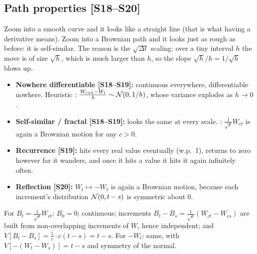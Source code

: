 \documentclass[10pt]{article}
\begin{document}
\subsection{Path properties [S18--S20]}
\begin{idea}
Zoom into a smooth curve and it looks like a straight line (that is what having a derivative means). Zoom into a Brownian path and it looks just as rough as before: it is self-similar. The reason is the $\sqrt{\Delta t}$ scaling: over a tiny interval $h$ the move is of size $\sqrt h$, which is much larger than $h$, so the slope $\sqrt h/h=1/\sqrt h$ blows up.
\end{idea}
\begin{itemize}
\item \textbf{Nowhere differentiable [S18--S19]:} continuous everywhere, differentiable nowhere. Heuristic \beyond: $\frac{W_{t+h}-W_t}{h}\sim\mathcal{N}(0,1/h)$, whose variance explodes as $h\to0$.
\item \textbf{Self-similar / fractal [S18--S19]:} looks the same at every scale. \beyond: $\frac{1}{\sqrt c}W_{ct}$ is again a Brownian motion for any $c>0$.
\item \textbf{Recurrence [S19]:} hits every real value eventually (w.p.\ 1), returns to zero however far it wanders, and once it hits a value it hits it again infinitely often.
\item \textbf{Reflection [S20]:} $W_t\mapsto-W_t$ is again a Brownian motion, because each increment's distribution $\mathcal{N}(0,t-s)$ is symmetric about $0$.
\end{itemize}
\begin{deriv}
For $B_t=\frac{1}{\sqrt c}W_{ct}$: $B_0=0$; continuous; increments $B_t-B_s=\frac{1}{\sqrt c}(W_{ct}-W_{cs})$ are built from non-overlapping increments of $W$, hence independent; and $V[B_t-B_s]=\frac1c\cdot c(t-s)=t-s$. For $-W_t$: same, with $V[-(W_t-W_s)]=t-s$ and symmetry of the normal.
\end{deriv}
\end{document}
